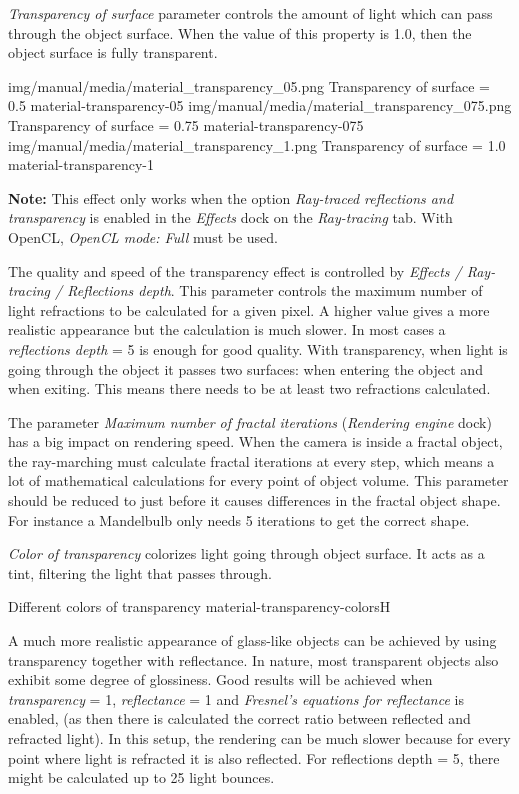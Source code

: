 \emph{Transparency of surface} parameter controls the amount of light which can pass through the object surface. 
When the value of this property is 1.0, then the object surface is fully transparent. 

\threeImagesWithTwoCaptionsFullWidth
{img/manual/media/material_transparency_05.png}
{Transparency of surface = 0.5}
{material-transparency-05}
{img/manual/media/material_transparency_075.png}
{Transparency of surface = 0.75}
{material-transparency-075}
{img/manual/media/material_transparency_1.png}
{Transparency of surface = 1.0}
{material-transparency-1}

\textbf{Note:} This effect only works when the option \emph{Ray-traced reflections and transparency} is enabled in the \emph{Effects} dock on the \emph{Ray-tracing} tab. With OpenCL, \emph{OpenCL mode: Full} must be used.

The quality and speed of the transparency effect is controlled by \emph{Effects / Ray-tracing / Reflections depth}. This parameter controls the maximum number of light refractions to be calculated for a given pixel. A higher value gives a more realistic appearance but the calculation is much slower. In most cases a \emph{reflections depth} = 5 is enough for good quality. With transparency, when light is going through the object it passes two surfaces: when entering the object and when exiting. This means there needs to be at least two refractions calculated.

The parameter \emph{Maximum number of fractal iterations} (\emph{Rendering engine} dock) has a big impact on rendering speed. When the camera is inside a fractal object, the ray-marching must calculate fractal iterations at every step, which means a lot of mathematical calculations for every point of object volume. This parameter should be reduced to just before it causes differences in the fractal object shape. For instance a Mandelbulb only needs 5 iterations to get the correct shape. 

\emph{Color of transparency} colorizes light going through object surface. It acts as a tint, filtering the light that passes through.

{Different colors of transparency}
{material-transparency-colors}{H}

A much more realistic appearance of glass-like objects can be achieved by using transparency together with reflectance. In nature, most transparent objects also exhibit some degree of glossiness. Good results will be achieved when \emph{transparency} = 1, \emph{reflectance} = 1 and \emph{Fresnel's equations for reflectance}  is enabled, (as then there is calculated the correct ratio between reflected and refracted light). In this setup, the rendering can be much slower because for every point where light is refracted it is also reflected. For reflections depth = 5, there might be calculated up to 25 light bounces. 

